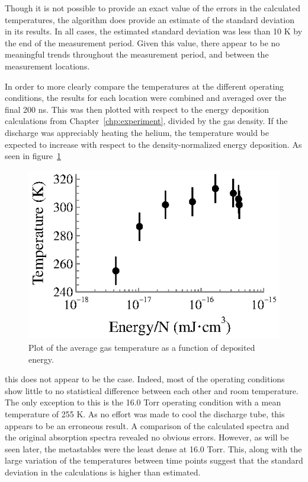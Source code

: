 Though it is not possible to provide an exact value of the errors in the
calculated temperatures, the algorithm does provide an estimate of the standard
deviation in its results. In all cases, the estimated standard deviation was less
than 10 K by the end of the measurement period. Given this value, there appear
to be no meaningful trends throughout the measurement period, and between the
measurement locations.

In order to more clearly compare the temperatures at the different operating
conditions, the results for each location were combined and averaged over the
final 200 ns. This was then plotted with respect to the energy deposition
calculations from Chapter~\ref{chp:experiment}, divided by the gas density. If
the discharge was appreciably heating the helium, the temperature would be
expected to increase with respect to the density-normalized energy deposition.
As seen in figure~\ref{fig:tvp}
\begin{figure}
  \centering
  \includegraphics{./chapters/metastables/figures/tvp.eps}
  \caption{Plot of the average gas temperature as a function of deposited
  energy.}
  \label{fig:tvp}
\end{figure}
this does not appear to be the case. Indeed, most of the operating conditions
show little to no statistical difference between each other and room
temperature. The only exception to this is the 16.0 Torr operating condition
with a mean temperature of 255 K. As no effort was made to cool the discharge
tube, this appears to be an erroneous result. A comparison of the calculated
spectra and the original absorption spectra revealed no obvious errors. However,
as will be seen later, the metastables were the least dense at 16.0 Torr. This,
along with the large variation of the temperatures between time points suggest
that the standard deviation in the calculations is higher than estimated. 

